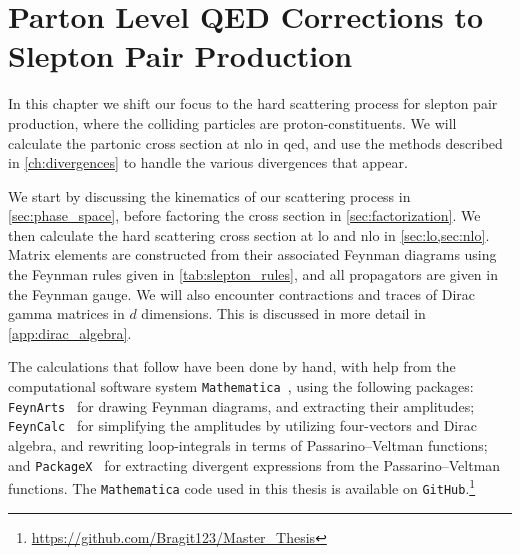 \chapter{Parton Level QED Corrections to Slepton Pair Production}\label{ch:parton_level}

In this chapter we shift our focus to the hard scattering process for slepton pair production, where the colliding particles are proton-constituents.
We will calculate the partonic cross section at \gls{nlo} in \gls{qed}, and use the methods described in \cref{ch:divergences} to handle the various divergences that appear.

We start by discussing the kinematics of our scattering process in \cref{sec:phase_space}, before factoring the cross section in \cref{sec:factorization}. We then calculate the hard scattering cross section at \gls{lo} and \gls{nlo} in \cref{sec:lo,sec:nlo}. Matrix elements are constructed from their associated Feynman diagrams using the Feynman rules given in \cref{tab:slepton_rules}, and all propagators are given in the Feynman gauge.
We will also encounter contractions and traces of Dirac gamma matrices in $d$ dimensions. This is discussed in more detail in \cref{app:dirac_algebra}.


The calculations that follow have been done by hand, with help from the computational software system \texttt{Mathematica}~\cite{Mathematica}, using the following packages: \texttt{FeynArts}~\cite{Hahn:2000kx,Hahn:2001rv} for drawing Feynman diagrams, and extracting their amplitudes; \texttt{FeynCalc}~\cite{Shtabovenko:2016sxi,Shtabovenko:2020gxv,Shtabovenko:2023idz,Mertig:1990an} for simplifying the amplitudes by utilizing four-vectors and Dirac algebra, and rewriting loop-integrals in terms of Passarino--Veltman functions; and \texttt{PackageX}~\cite{Patel:2015tea,Patel:2016fam} for extracting divergent expressions from the Passarino--Veltman functions.
The \texttt{Mathematica} code used in this thesis is available on \texttt{GitHub}.\footnote{\url{https://github.com/Bragit123/Master_Thesis}}


